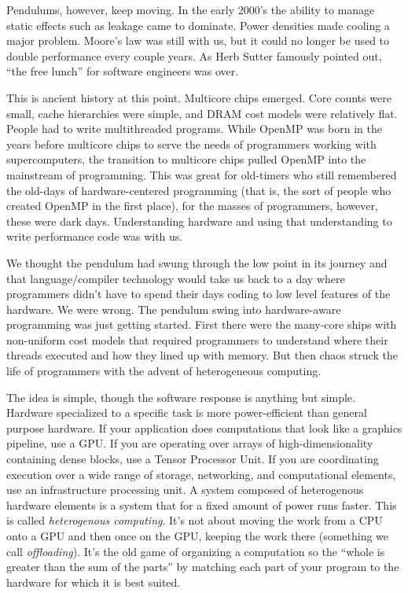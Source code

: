 Pendulums, however, keep moving.  In the early 2000's the ability to manage static effects such as 
leakage came to dominate.   Power densities made cooling a major problem.  Moore's law was 
still with us, but it could no longer be used to double performance every couple years.
As Herb Sutter famously pointed out, ``the free lunch'' for software engineers was over. 

This is ancient history at this point.  Multicore chips emerged.  Core counts were small, cache hierarchies were 
simple, and DRAM cost models were relatively flat.   People had to write multithreaded programs.   While OpenMP
was born in the years before multicore chips to serve the needs of programmers working with supercomputers,
the transition to multicore chips pulled OpenMP into the mainstream of programming.  This was great for 
old-timers who still remembered the old-days of hardware-centered programming (that is, the sort of people 
who created OpenMP in the first place), for the masses of programmers, however, these were dark days.
Understanding hardware and using that understanding to write performance code was with us.

We thought the pendulum had swung through the low point in its journey and that language/compiler technology
would take us back to a day where programmers didn't have to spend their days coding to low level features of the
hardware.  We were wrong.  The pendulum swing into hardware-aware programming was just getting started.
First there were the many-core ships with non-uniform cost models that required programmers to understand
where their threads executed and how they lined up with memory.  But then chaos struck the life of programmers with
the advent of heterogeneous computing.

The idea is simple, though the software response is anything but simple.  Hardware specialized to a specific task is
more power-efficient than general purpose hardware.   If your application does computations that look like a graphics pipeline, 
use a GPU.   If you are operating over arrays of high-dimensionality containing dense blocks, use a Tensor Processor Unit.  If
you are coordinating execution over a wide range of storage, networking, and computational elements, use an infrastructure
processing unit. A system composed of heterogenous hardware elements is a system that for a fixed amount of power runs faster.
This is called \emph{heterogenous computing}.   It's not about moving the work from a CPU onto a GPU and then once on the 
GPU, keeping the work there (something we call \emph{offloading}).   It's the old game of organizing a computation 
so the ``whole is greater than the sum of the parts'' by matching each part of your program to the hardware for which it is best suited.

